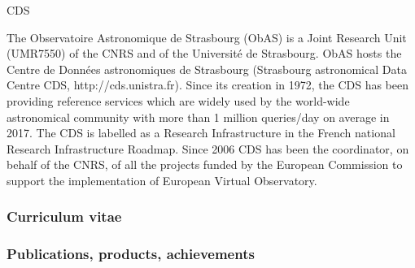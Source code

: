 \begin{sitedescription}{CDS}

The Observatoire Astronomique de Strasbourg (ObAS) is a Joint Research Unit
(UMR7550) of the CNRS and of the Université de Strasbourg. ObAS hosts the 
Centre de Données astronomiques de Strasbourg (Strasbourg astronomical Data 
Centre CDS, http://cds.unistra.fr). Since its creation in 1972, the CDS has 
been providing reference services which are widely used by the world-wide 
astronomical community with more than 1 million queries/day on average in 
2017. The CDS is labelled as a Research Infrastructure in the French national
Research Infrastructure Roadmap. Since 2006 CDS has been the coordinator,
on behalf of the CNRS, of all the projects funded by the European Commission
to support the implementation of European Virtual Observatory. 

%

\subsubsection*{Curriculum vitae}


%
%






\subsubsection*{Publications, products, achievements}


\end{sitedescription}
